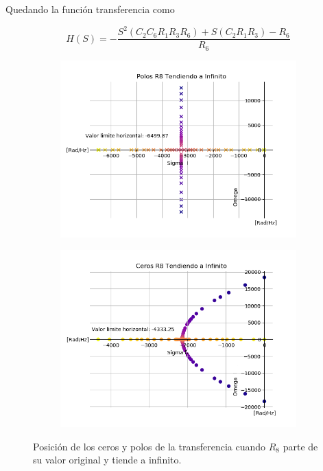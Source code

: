 Quedando la función transferencia como

\begin{equation}
H(S) = - \frac{S^2 (C_2 C_6 R_1 R_3 R_6) + S (C_2 R_1 R_3) - R_6}{R_6}
\label{eq:r8a0}
\end{equation}

\begin{figure}[H]
	\centering
	\begin{subfigure}[t]{0.49\textwidth}
	\hspace*{-2cm}
	\centering
		\includegraphics[width=1.1\textwidth]{Imagenes1/polosr8ainf.png}
	\end{subfigure}
	\begin{subfigure}[t]{0.49\textwidth}
	\centering
		\includegraphics[width=1.1\textwidth]{Imagenes1/cerosr8ainf.png}
	\end{subfigure}
	\caption{Posición de los ceros y polos de la transferencia cuando $R_8$ parte de su valor original y tiende a infinito.}
	\label{fig:r8ainf}
\end{figure}

